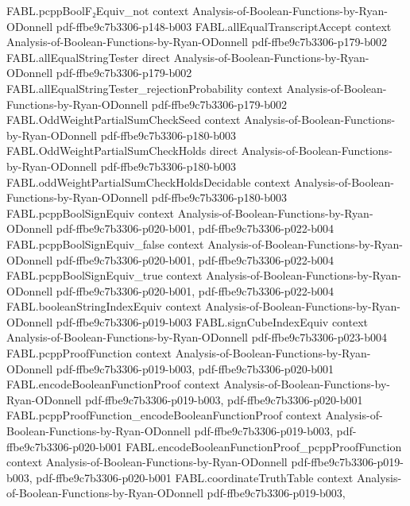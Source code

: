 \begin{theorem}
\proofstep
  {FABL.pcppBoolF₂Equiv_not}
  {context}
  {Analysis-of-Boolean-Functions-by-Ryan-ODonnell}
  {pdf-ffbe9c7b3306-p148-b003}
\proofstep
  {FABL.allEqualTranscriptAccept}
  {context}
  {Analysis-of-Boolean-Functions-by-Ryan-ODonnell}
  {pdf-ffbe9c7b3306-p179-b002}
\proofstep
  {FABL.allEqualStringTester}
  {direct}
  {Analysis-of-Boolean-Functions-by-Ryan-ODonnell}
  {pdf-ffbe9c7b3306-p179-b002}
\proofstep
  {FABL.allEqualStringTester_rejectionProbability}
  {context}
  {Analysis-of-Boolean-Functions-by-Ryan-ODonnell}
  {pdf-ffbe9c7b3306-p179-b002}
\proofstep
  {FABL.OddWeightPartialSumCheckSeed}
  {context}
  {Analysis-of-Boolean-Functions-by-Ryan-ODonnell}
  {pdf-ffbe9c7b3306-p180-b003}
\proofstep
  {FABL.OddWeightPartialSumCheckHolds}
  {direct}
  {Analysis-of-Boolean-Functions-by-Ryan-ODonnell}
  {pdf-ffbe9c7b3306-p180-b003}
\proofstep
  {FABL.oddWeightPartialSumCheckHoldsDecidable}
  {context}
  {Analysis-of-Boolean-Functions-by-Ryan-ODonnell}
  {pdf-ffbe9c7b3306-p180-b003}
\proofstep
  {FABL.pcppBoolSignEquiv}
  {context}
  {Analysis-of-Boolean-Functions-by-Ryan-ODonnell}
  {pdf-ffbe9c7b3306-p020-b001,
    pdf-ffbe9c7b3306-p022-b004}
\proofstep
  {FABL.pcppBoolSignEquiv_false}
  {context}
  {Analysis-of-Boolean-Functions-by-Ryan-ODonnell}
  {pdf-ffbe9c7b3306-p020-b001,
    pdf-ffbe9c7b3306-p022-b004}
\proofstep
  {FABL.pcppBoolSignEquiv_true}
  {context}
  {Analysis-of-Boolean-Functions-by-Ryan-ODonnell}
  {pdf-ffbe9c7b3306-p020-b001,
    pdf-ffbe9c7b3306-p022-b004}
\proofstep
  {FABL.booleanStringIndexEquiv}
  {context}
  {Analysis-of-Boolean-Functions-by-Ryan-ODonnell}
  {pdf-ffbe9c7b3306-p019-b003}
\proofstep
  {FABL.signCubeIndexEquiv}
  {context}
  {Analysis-of-Boolean-Functions-by-Ryan-ODonnell}
  {pdf-ffbe9c7b3306-p023-b004}
\proofstep
  {FABL.pcppProofFunction}
  {context}
  {Analysis-of-Boolean-Functions-by-Ryan-ODonnell}
  {pdf-ffbe9c7b3306-p019-b003,
    pdf-ffbe9c7b3306-p020-b001}
\proofstep
  {FABL.encodeBooleanFunctionProof}
  {context}
  {Analysis-of-Boolean-Functions-by-Ryan-ODonnell}
  {pdf-ffbe9c7b3306-p019-b003,
    pdf-ffbe9c7b3306-p020-b001}
\proofstep
  {FABL.pcppProofFunction_encodeBooleanFunctionProof}
  {context}
  {Analysis-of-Boolean-Functions-by-Ryan-ODonnell}
  {pdf-ffbe9c7b3306-p019-b003,
    pdf-ffbe9c7b3306-p020-b001}
\proofstep
  {FABL.encodeBooleanFunctionProof_pcppProofFunction}
  {context}
  {Analysis-of-Boolean-Functions-by-Ryan-ODonnell}
  {pdf-ffbe9c7b3306-p019-b003,
    pdf-ffbe9c7b3306-p020-b001}
\proofstep
  {FABL.coordinateTruthTable}
  {context}
  {Analysis-of-Boolean-Functions-by-Ryan-ODonnell}
  {pdf-ffbe9c7b3306-p019-b003,
}
\end{theorem}
